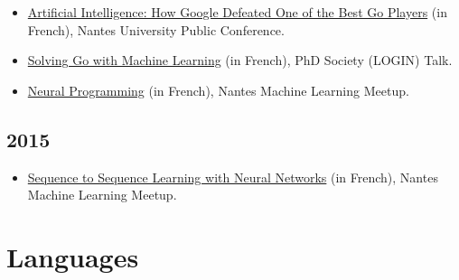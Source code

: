 \documentclass[11pt,a4paper,sans]{moderncv}        %
\begin{document}
\begin{itemize}
\item \href{https://youtu.be/xv2S8A1EPqI}{Artificial Intelligence: How
    Google Defeated One of the Best Go Players} (in French), Nantes
  University Public Conference.
\item \href{https://youtu.be/KuvXb2nILLc}{Solving Go with Machine
    Learning} (in French), PhD Society (LOGIN) Talk.
\item
  \href{https://www.meetup.com/Nantes-Machine-Learning-Meetup/events/226648150/}{Neural
    Programming} (in French), Nantes Machine Learning Meetup.
\end{itemize}

\subsection{2015}

\begin{itemize}
\item
  \href{https://www.meetup.com/Nantes-Machine-Learning-Meetup/events/221108033/}{Sequence
    to Sequence Learning with Neural Networks} (in French), Nantes
  Machine Learning Meetup.
\end{itemize}

\section{Languages}
\end{document}

